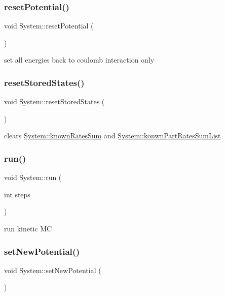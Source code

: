 \subsubsection{\texorpdfstring{reset\+Potential()}{resetPotential()}}
{\footnotesize\ttfamily void System\+::reset\+Potential (\begin{DoxyParamCaption}{ }\end{DoxyParamCaption})\hspace{0.3cm}{\ttfamily [private]}}

set all energies back to coulomb interaction only \mbox{\label{classSystem_ab8fd982f98b67cb94f9cb0085b440751}} 
\subsubsection{\texorpdfstring{reset\+Stored\+States()}{resetStoredStates()}}
{\footnotesize\ttfamily void System\+::reset\+Stored\+States (\begin{DoxyParamCaption}{ }\end{DoxyParamCaption})}

clears \hyperlink{classSystem_af23703acd38834ecb9381425724f4ca5}{System\+::known\+Rates\+Sum} and \hyperlink{classSystem_a9892a3f67a51872cce3577ec50a55a5d}{System\+::konwn\+Part\+Rates\+Sum\+List} \mbox{\label{classSystem_a166f8dc2f77ff0ff2df9b25f8740a134}} 
\subsubsection{\texorpdfstring{run()}{run()}}
{\footnotesize\ttfamily void System\+::run (\begin{DoxyParamCaption}\item[{int}]{steps }\end{DoxyParamCaption})}

run kinetic MC \mbox{\label{classSystem_ad41034bcdfc24395e67fe7e3d5f50330}} 
\subsubsection{\texorpdfstring{set\+New\+Potential()}{setNewPotential()}}
{\footnotesize\ttfamily void System\+::set\+New\+Potential (\begin{DoxyParamCaption}{ }\end{DoxyParamCaption})\hspace{0.3cm}{\ttfamily [private]}}

